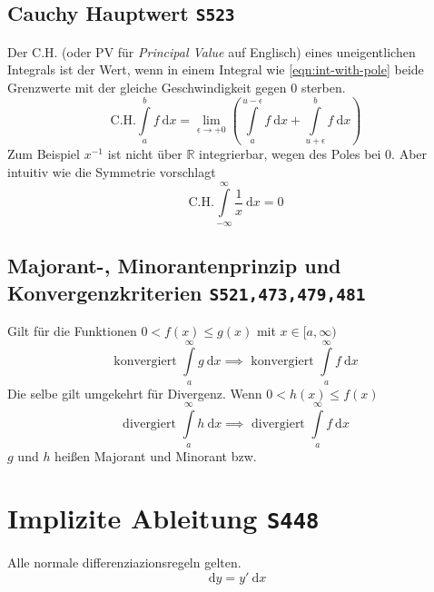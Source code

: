 \documentclass[a4paper]{article}
\numberwithin{equation}{subsection}
\newcommand{\dd}[1]{\ensuremath{~\mathrm{d}#1}}
\newcommand{\pderiv}[2]{\ensuremath{\frac{\partial#1}{\partial#2}}}
\newcommand{\brpage}[1]{\textcolor{red!70!black}{\small\texttt{S#1}}}
\begin{document}
\begin{multicols}{2}
\subsection{Cauchy Hauptwert \brpage{523}}
Der C.H. (oder PV f\"ur \emph{Principal Value} auf Englisch) eines uneigentlichen Integrals ist der Wert, wenn in einem Integral wie \eqref{eqn:int-with-pole} beide Grenzwerte mit der gleiche Geschwindigkeit gegen 0 sterben.
\[
	\text{C.H.} \int\limits_a^b f \dd{x} = 
	\lim_{\epsilon\to +0} \left( \int\limits_a^{u-\epsilon} f \dd{x}
	+ \int\limits_{u+\epsilon}^b f \dd{x} \right)
\]
Zum Beispiel \(x^{-1}\) ist nicht \"uber \(\mathbb{R}\) integrierbar, wegen des Poles bei 0. Aber intuitiv wie die Symmetrie vorschlagt
\[
 	\text{C.H.} \int\limits^\infty_{-\infty} \frac{1}{x} \dd{x} = 0
\]

\subsection{Majorant-, Minorantenprinzip und Konvergenzkriterien \brpage{521,473,479,481}}

Gilt f\"ur die Funktionen \(0 < f(x) \leq g(x)\) mit \(x \in [a,\infty)\)
\[
	\text{konvergiert } \int\limits_a^\infty g \dd{x} 
	\implies \text{ konvergiert } \int\limits_a^\infty f \dd{x}
\]
Die selbe gilt umgekehrt f\"ur Divergenz. Wenn \(0 < h(x) \leq f(x)\) 
\[
	\text{divergiert } \int\limits_a^\infty h \dd{x} 
	\implies \text{ divergiert } \int\limits_a^\infty f \dd{x}
\]
\(g\) und \(h\) hei{\ss}en Majorant und Minorant bzw.

\section{Implizite Ableitung \brpage{448}}
Alle normale differenziazionsregeln gelten.
\[
	\dd{y} = y'\dd{x}
\]

\end{multicols}
\end{document}
